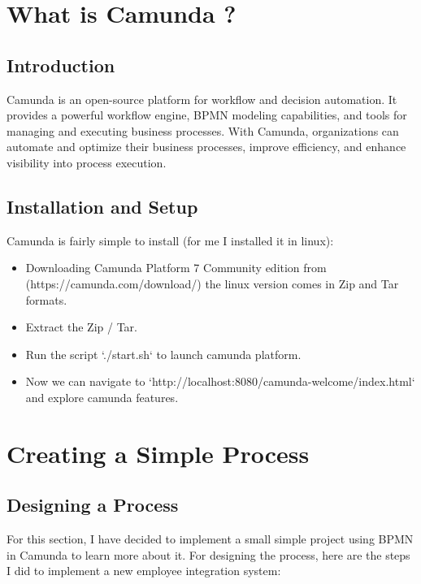 \documentclass[12pt]{article}
\begin{document}
{\section{What is Camunda ?}

  \subsection{Introduction}

Camunda is an open-source platform for workflow and decision automation. It provides a powerful workflow engine, BPMN modeling capabilities, and tools for managing and executing business processes. With Camunda, organizations can automate and optimize their business processes, improve efficiency, and enhance visibility into process execution.

\pagebreak

  \subsection{Installation and Setup}

Camunda is fairly simple to install (for me I installed it in linux):

  \begin{itemize}
    \item Downloading Camunda Platform 7 Community edition from (https://camunda.com/download/) the linux version comes in Zip and Tar formats.
    \item Extract the Zip / Tar.
    \item Run the script `./start.sh` to launch camunda platform.
    \item Now we can navigate to `http://localhost:8080/camunda-welcome/index.html` and explore camunda features.
  \end{itemize}

\pagebreak

\section{Creating a Simple Process}

  \subsection{Designing a Process}
  
For this section, I have decided to implement a small simple project using BPMN in Camunda to learn more about it.
For designing the process, here are the steps I did to implement a new employee integration system:

}
\end{document}
